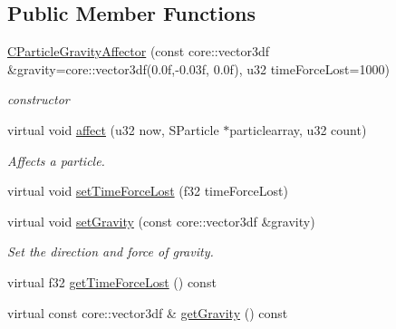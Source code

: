 \subsection*{Public Member Functions}
\begin{DoxyCompactItemize}
\item 
\hypertarget{classirr_1_1scene_1_1_c_particle_gravity_affector_a0559a00d3db4582296955d1ee42b3d21}{\hyperlink{classirr_1_1scene_1_1_c_particle_gravity_affector_a0559a00d3db4582296955d1ee42b3d21}{C\-Particle\-Gravity\-Affector} (const core\-::vector3df \&gravity=core\-::vector3df(0.\-0f,-\/0.\-03f, 0.\-0f), u32 time\-Force\-Lost=1000)}\label{classirr_1_1scene_1_1_c_particle_gravity_affector_a0559a00d3db4582296955d1ee42b3d21}

\begin{DoxyCompactList}\small\item\em constructor \end{DoxyCompactList}\item 
virtual void \hyperlink{classirr_1_1scene_1_1_c_particle_gravity_affector_ae5e505e59fedad636bfa173a63b23908}{affect} (u32 now, S\-Particle $\ast$particlearray, u32 count)
\begin{DoxyCompactList}\small\item\em Affects a particle. \end{DoxyCompactList}\item 
virtual void \hyperlink{classirr_1_1scene_1_1_c_particle_gravity_affector_a5ad067a97a360878dbe6bce2b4f4c61e}{set\-Time\-Force\-Lost} (f32 time\-Force\-Lost)
\item 
\hypertarget{classirr_1_1scene_1_1_c_particle_gravity_affector_a45f75d43207efe4d9994da114195812f}{virtual void \hyperlink{classirr_1_1scene_1_1_c_particle_gravity_affector_a45f75d43207efe4d9994da114195812f}{set\-Gravity} (const core\-::vector3df \&gravity)}\label{classirr_1_1scene_1_1_c_particle_gravity_affector_a45f75d43207efe4d9994da114195812f}

\begin{DoxyCompactList}\small\item\em Set the direction and force of gravity. \end{DoxyCompactList}\item 
virtual f32 \hyperlink{classirr_1_1scene_1_1_c_particle_gravity_affector_abfb518370e03c89fba4ec02f06ab510f}{get\-Time\-Force\-Lost} () const 
\item 
\hypertarget{classirr_1_1scene_1_1_c_particle_gravity_affector_a122c71b8c63ae049e48170ed9c9db274}{virtual const core\-::vector3df \& \hyperlink{classirr_1_1scene_1_1_c_particle_gravity_affector_a122c71b8c63ae049e48170ed9c9db274}{get\-Gravity} () const }\label{classirr_1_1scene_1_1_c_particle_gravity_affector_a122c71b8c63ae049e48170ed9c9db274}


\end{DoxyCompactItemize}
